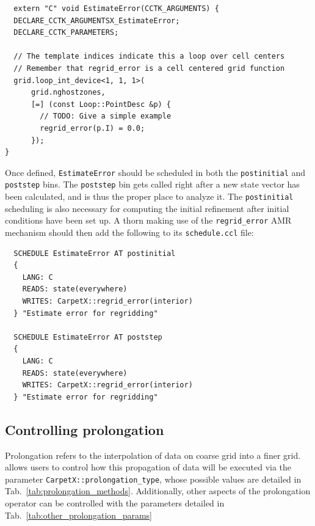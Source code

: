 \begin{verbatim}
  extern "C" void EstimateError(CCTK_ARGUMENTS) {
  DECLARE_CCTK_ARGUMENTSX_EstimateError;
  DECLARE_CCTK_PARAMETERS;

  // The template indices indicate this a loop over cell centers
  // Remember that regrid_error is a cell centered grid function
  grid.loop_int_device<1, 1, 1>(
      grid.nghostzones,
      [=] (const Loop::PointDesc &p) {
        // TODO: Give a simple example
        regrid_error(p.I) = 0.0;
      });
}
\end{verbatim}

Once defined, \texttt{EstimateError} should be scheduled in both the \texttt{postinitial} and \texttt{poststep} bins. The \texttt{poststep} bin gets called right after a new state vector has been calculated, and is thus the proper place to analyze it. The \texttt{postinitial} scheduling is also necessary for computing the initial refinement after initial conditions have been set up. A thorn making use of the \texttt{regrid\_error} AMR mechanism should then add the following to its \texttt{schedule.ccl} file:

\begin{verbatim}
  SCHEDULE EstimateError AT postinitial
  {
    LANG: C
    READS: state(everywhere)
    WRITES: CarpetX::regrid_error(interior)
  } "Estimate error for regridding"
  
  SCHEDULE EstimateError AT poststep
  {
    LANG: C
    READS: state(everywhere)
    WRITES: CarpetX::regrid_error(interior)
  } "Estimate error for regridding"
\end{verbatim}

\subsection{Controlling prolongation}

Prolongation refers to the interpolation of data on coarse grid into a finer grid. \CarpetX\space allows users to control how this propagation of data will be executed via the parameter \texttt{CarpetX::prolongation\_type}, whose possible values are detailed in Tab.~\ref{tab:prolongation_methods}. Additionally, other aspects of the prolongation operator can be controlled with the parameters detailed in Tab.~\ref{tab:other_prolongation_params}

